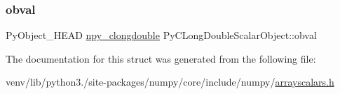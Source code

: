 \subsubsection{\texorpdfstring{obval}{obval}}
{\footnotesize\ttfamily Py\+Object\+\_\+\+H\+E\+AD \hyperlink{structnpy__clongdouble}{npy\+\_\+clongdouble} Py\+C\+Long\+Double\+Scalar\+Object\+::obval}



The documentation for this struct was generated from the following file\+:\begin{DoxyCompactItemize}
\item 
venv/lib/python3./site-\/packages/numpy/core/include/numpy/\hyperlink{arrayscalars_8h}{arrayscalars.\+h}\end{DoxyCompactItemize}
